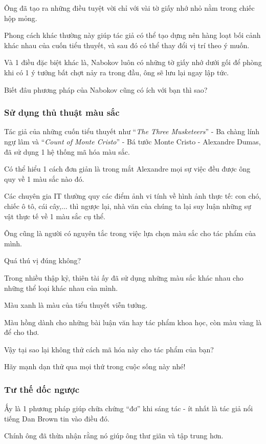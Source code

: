 \documentclass{article}
\begin{document}
Ông đã tạo ra những điều tuyệt vời chỉ với vài tờ giấy nhớ nhỏ nằm trong chiếc hộp mỏng.

Phong cách khác thường này giúp tác giả có thể tạo dựng nên hàng loạt bối cảnh khác nhau của cuốn tiểu thuyết, và sau đó có thể thay đổi vị trí theo ý muốn.

Và  1 điều đặc biệt khác là, Nabokov luôn có những tờ giấy nhớ dưới gối để phòng khi có 1 ý tưởng bất chợt nảy ra trong đầu, ông sẽ lưu lại ngay lập tức. 

Biết đâu phương pháp của Nabokov cũng có ích với bạn thì sao?

\subsubsection{Sử dụng thủ thuật màu sắc}
Tác giả của những cuốn tiểu thuyết như  ``\textit{The Three Musketeers}'' - Ba chàng lính ngự lâm và ``\textit{Count of Monte Cristo}'' - Bá tước Monte Cristo - Alexandre Dumas, đã sử dụng 1 hệ thống mã hóa màu sắc.

Có thể hiểu 1 cách đơn giản là trong mắt Alexandre mọi sự việc đều được ông quy về 1 màu sắc nào đó.

Các chuyên gia IT thường quy các điểm ảnh vi tính về hình ảnh thực tế: con chó, chiếc ô tô, cái cây,$\ldots$ thì ngược lại, nhà văn của chúng ta lại suy luận những sự vật thực tế về 1 màu sắc cụ thể. 

Ông cũng là người có nguyên tắc trong việc lựa chọn màu sắc cho tác phẩm của mình.

Quá thú vị đúng không?

Trong nhiều thập kỷ, thiên tài ấy đã sử dụng những màu sắc khác nhau cho những thể loại khác nhau của mình.

Màu xanh là màu của tiểu thuyết viễn tưởng.

Màu hồng dành cho những bài luận văn hay tác phẩm khoa học, còn màu vàng là để cho thơ.

Vậy tại sao lại không thử cách mã hóa này cho tác phẩm của bạn?

Hãy mạnh dạn thử qua mọi thứ trong cuộc sống này nhé!

\subsubsection{Tư thế dốc ngược}
Ấy là 1 phương pháp giúp chữa chứng ``đơ'' khi sáng tác -  ít nhất là tác giả nổi tiếng Dan Brown tin vào điều đó.

Chính ông đã thừa nhận rằng nó giúp ông thư giãn và tập trung hơn.
\end{document}
